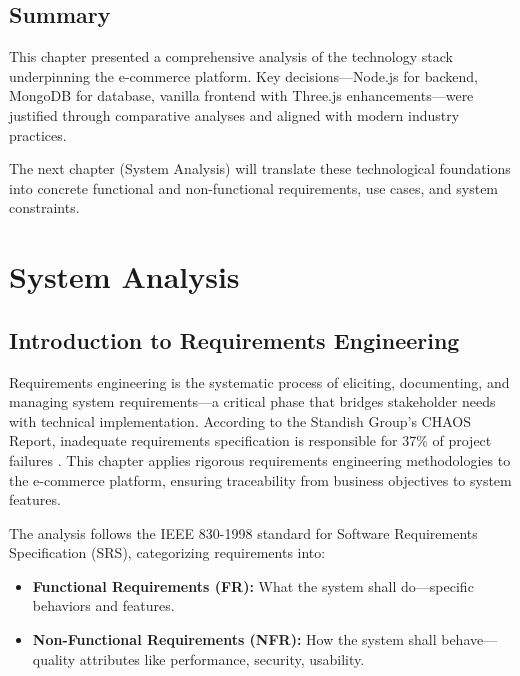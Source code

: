 \section{Summary}

This chapter presented a comprehensive analysis of the technology stack underpinning the e-commerce platform. Key decisions—Node.js for backend, MongoDB for database, vanilla frontend with Three.js enhancements—were justified through comparative analyses and aligned with modern industry practices.

The next chapter (System Analysis) will translate these technological foundations into concrete functional and non-functional requirements, use cases, and system constraints.


\chapter{System Analysis}

\section{Introduction to Requirements Engineering}

Requirements engineering is the systematic process of eliciting, documenting, and managing system requirements—a critical phase that bridges stakeholder needs with technical implementation. According to the Standish Group's CHAOS Report, inadequate requirements specification is responsible for 37\% of project failures \cite{standish2020}. This chapter applies rigorous requirements engineering methodologies to the e-commerce platform, ensuring traceability from business objectives to system features.

The analysis follows the IEEE 830-1998 standard for Software Requirements Specification (SRS), categorizing requirements into:

\begin{itemize}
    \item \textbf{Functional Requirements (FR):} What the system shall do—specific behaviors and features.
    \item \textbf{Non-Functional Requirements (NFR):} How the system shall behave—quality attributes like performance, security, usability.
\end{itemize}

